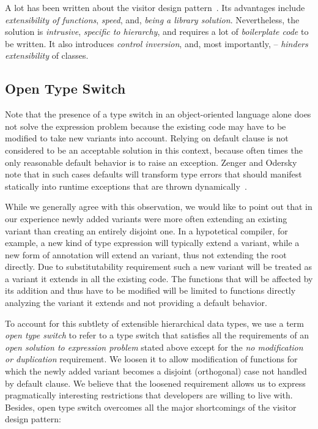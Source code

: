 A lot has been written about the visitor design pattern~\cite{DesignPatterns1993,Palsberg98,Zenger:2001,Oliveira08}. 
Its advantages include \emph{extensibility of functions}, \emph{speed}, and, 
\emph{being a library solution}. Nevertheless, the solution is \emph{intrusive}, 
\emph{specific to hierarchy}, and requires a lot of \emph{boilerplate code} to 
be written. It also introduces \emph{control inversion}, and, most importantly, 
-- \emph{hinders extensibility} of classes.


\subsection{Open Type Switch}

Note that the presence of a type switch in an object-oriented language alone 
does not solve the expression problem because the existing code may have to be 
modified to take new variants into account. Relying on default clause is not 
considered to be an acceptable solution in this context, because often times the 
only reasonable default behavior is to raise an exception. Zenger and Odersky 
note that in such cases defaults will transform type errors that should manifest 
statically into runtime exceptions that are thrown dynamically~\cite{fool12}.

While we generally agree with this observation, we would like to point out that 
in our experience newly added variants were more often extending an existing 
variant than creating an entirely disjoint one. In a hypotetical compiler, for 
example, a new kind of type expression will typically extend a 
 variant, while a new form of annotation will extend an 
 variant, thus not extending the root  directly. 
Due to substitutability requirement such a new variant will be treated as a 
variant it extends in all the existing code. The functions that will be affected 
by its addition and thus have to be modified will be limited to functions 
directly analyzing the variant it extends and not providing a default behavior.

To account for this subtlety of extensible hierarchical data types, we use a 
term \emph{open type switch} to refer to a type switch that satisfies all the 
requirements of an \emph{open solution to expression problem} stated above 
except for the \emph{no modification or duplication} requirement. We loosen it 
to allow modification of functions for which the newly added variant becomes a 
disjoint (orthogonal) case not handled by default clause. We believe that the 
loosened requirement allows us to express pragmatically interesting restrictions 
that developers are willing to live with. Besides, open type switch overcomes 
all the major shortcomings of the visitor design pattern:

